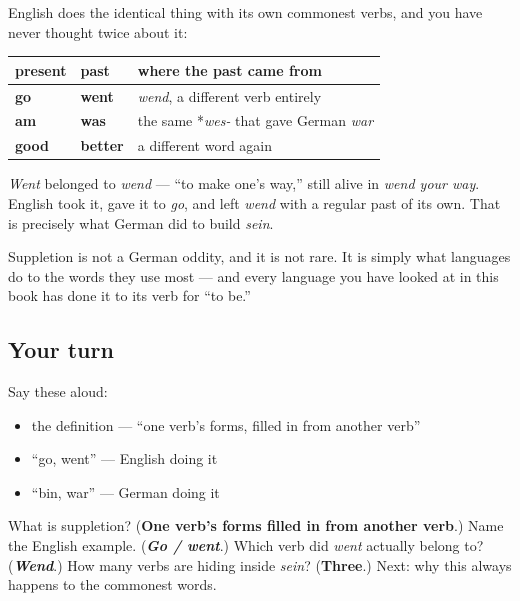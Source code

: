 \begin{cousinweb}
English does the identical thing with its own commonest verbs, and you have never thought twice about it:

\noindent
\begin{tabularx}{\linewidth}{@{}>{\raggedright\arraybackslash}X>{\raggedright\arraybackslash}X>{\raggedright\arraybackslash}X@{}}
\toprule
\textbf{present} & \textbf{past} & \textbf{where the past came from} \\
\midrule
\textbf{go} & \textbf{went} & \emph{wend}, a different verb entirely \\
\textbf{am} & \textbf{was} & the same *\emph{wes-} that gave German \emph{war} \\
\textbf{good} & \textbf{better} & a different word again \\
\bottomrule
\end{tabularx}

\emph{Went} belonged to \emph{wend} — \textquotedblleft{}to make one's way,\textquotedblright{} still alive in \emph{wend your way}. English took it, gave it to \emph{go}, and left \emph{wend} with a regular past of its own. That is precisely what German did to build \emph{sein}.

Suppletion is not a German oddity, and it is not rare. It is simply what languages do to the words they use most — and every language you have looked at in this book has done it to its verb for \textquotedblleft{}to be.\textquotedblright{}
\end{cousinweb}

\subsection*{Your turn}
Say these aloud:

\begin{itemize}
\raggedright
  \item the definition — \textquotedblleft{}one verb's forms, filled in from another verb\textquotedblright{}
  \item \textquotedblleft{}go, went\textquotedblright{} — English doing it
  \item \textquotedblleft{}bin, war\textquotedblright{} — German doing it
\end{itemize}

\begin{tcolorbox}[breakable,colback=teal!4,colframe=teal!35!black,title={Before you move on}]
What is suppletion? (\textbf{One verb's forms filled in from another verb}.) Name the English example. (\emph{\textbf{Go / went}}.) Which verb did \emph{went} actually belong to? (\emph{\textbf{Wend}}.) How many verbs are hiding inside \emph{sein}? (\textbf{Three}.) Next: why this always happens to the commonest words.
\end{tcolorbox}
